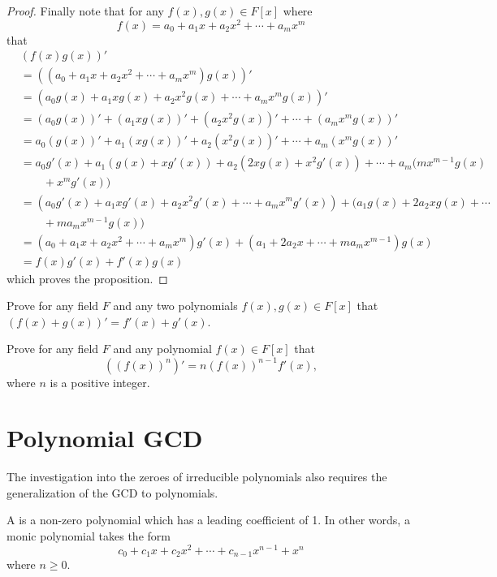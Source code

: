 \begin{proof}
    Finally note that for any $f(x), g(x) \in F[x]$ where
    \[
        f(x) = a_0 + a_1x + a_2x^2 + \cdots + a_mx^m
    \]
    that
    \begin{align*}
        &(f(x)g(x))'\\
        &= \left((a_0 + a_1x + a_2x^2 + \cdots + a_mx^m)g(x)\right)'\\
        &= \left(a_0g(x) + a_1xg(x) + a_2x^2g(x) + \cdots + a_mx^mg(x)\right)'\\
        &= (a_0g(x))' + (a_1xg(x))' + (a_2x^2g(x))' + \cdots + (a_mx^mg(x))'\\
        &= a_0(g(x))' + a_1(xg(x))' + a_2(x^2g(x))' + \cdots + a_m(x^mg(x))'\\
        &= a_0g'(x) + a_1(g(x) + xg'(x)) + a_2(2xg(x) + x^2g'(x)) + \cdots + a_m(mx^{m-1}g(x)\\
        &\quad\quad+ x^mg'(x))\\
        &= (a_0g'(x) + a_1xg'(x) + a_2x^2g'(x) + \cdots + a_mx^mg'(x)) + (a_1g(x) + 2a_2xg(x) + \cdots\\
        &\quad\quad+ ma_mx^{m-1}g(x))\\
        &= (a_0 + a_1x + a_2x^2 + \cdots + a_mx^m)g'(x) + (a_1 + 2a_2x + \cdots + ma_mx^{m-1})g(x)\\
        &= f(x)g'(x) + f'(x)g(x)
    \end{align*}
    which proves the proposition.
\end{proof}

\begin{exercise}\label{exercise-derivative-sum-rule}
    Prove for any field $F$ and any two polynomials $f(x), g(x) \in F[x]$ that $(f(x)+g(x))' = f'(x) + g'(x)$.
\end{exercise}

\begin{exercise}
    Prove for any field $F$ and any polynomial $f(x) \in F[x]$ that
    \[
        \left((f(x))^n\right)' = n(f(x))^{n-1}f'(x),
    \]
    where $n$ is a positive integer.
\end{exercise}

\section{Polynomial GCD}
The investigation into the zeroes of irreducible polynomials also requires the generalization of the GCD to polynomials.

\begin{definition}
    A  is a non-zero polynomial which has a leading coefficient of 1. In other words, a monic polynomial takes the form
    \[
        c_0 + c_1x + c_2x^2 + \cdots + c_{n-1}x^{n-1} + x^n
    \]
    where $n \geq 0$.
\end{definition}



